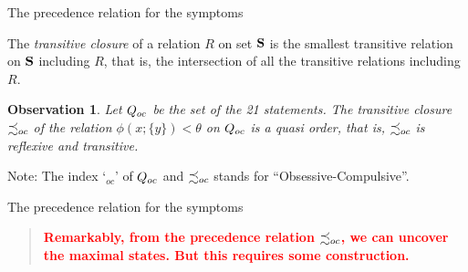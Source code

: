 \documentclass{beamer}
\newtheorem{observation}[theorem]{Observation}
\def\wl{\vskip 4mm}
\def\hh{\theta}
\def\rtxt#1{\textcolor{red}{#1}}
\def\QOC{Q_{\tiny oc}}
\def\pOC{\precsim_{\tiny oc}}
\begin{document}
\begin{frame}{The precedence relation for  the symptoms}
\center
\begin{minipage}{11cm}
\begin{definition} The {\sl transitive closure} of a relation $R$ on set $\bf S$ is the smallest transitive relation on $\bf S$ including $R$, that is, the intersection of all the transitive relations including $R$.
\end{definition} 
\wl
\begin{observation} Let $\QOC$ be the set of the 21 statements.  The transitive closure  $\pOC$  of the relation  $\phi(x;\{y\})<\hh$  on $\QOC$  is a quasi order, that is, $\pOC$ is reflexive and transitive.
\end{observation}
\wl
{\sc Note:} The index `$_{oc}$' of $\QOC$ and $\pOC$ stands for ``Obsessive-Compulsive''.


\end{minipage}
 \vspace{.5cm}




\end{frame}
\begin{frame}{The precedence relation for  the symptoms}
\center
\begin{minipage}{11cm} 
\wl
\begin{quote}
\rtxt{\bf Remarkably, from the precedence relation $\pOC$, we can uncover the maximal states.
But this requires some construction.
}
\end{quote}
\end{minipage}
 \vspace{.5cm}

\end{frame}
\end{document}
